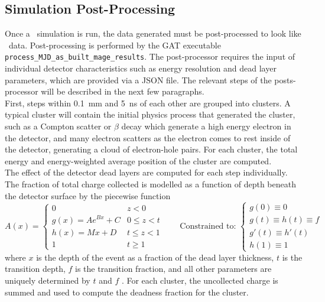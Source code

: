 \documentclass[/main.tex]{subfiles}
\begin{document}
\subsection{Simulation Post-Processing} \label{sec:simpostproc}
Once a \Mage\ simulation is run, the data generated must be post-processed to look like \MJD\ data.
Post-processing is performed by the GAT executable \texttt{process\_MJD\_as\_built\_mage\_results}.
The post-processor requires the input of individual detector characteristics such as energy resolution and dead layer parameters, which are provided via a JSON file.
The relevant steps of the posts-processor will be described in the next few paragraphs.
\\
First, steps within 0.1~mm and 5~ns of each other are grouped into clusters.
A typical cluster will contain the initial physics process that generated the cluster, such as a Compton scatter or $\beta$ decay which generate a high energy electron in the detector, and many electron scatters as the electron comes to rest inside of the detector, generating a cloud of electron-hole pairs.
For each cluster, the total energy and energy-weighted average position of the cluster are computed.
\\
The effect of the detector dead layers are computed for each step individually.
The fraction of total charge collected is modelled as a function of depth beneath the detector surface by the piecewise function
\begin{equation}
  A(x) = \begin{cases}
    0 & z < 0 \\
    g(x)=Ae^{Bx} + C & 0 \leq z < t \\
    h(x)=Mx + D & t \leq z < 1 \\
    1 & t \geq 1
  \end{cases}  \qquad
  \text{Constrained to: } \begin{cases}
    g(0)\equiv 0 \\ g(t)\equiv h(t)\equiv f \\ g'(t)\equiv h'(t) \\ h(1)\equiv 1
  \end{cases}
\end{equation}
where $x$ is the depth of the event as a fraction of the dead layer thickness, $t$ is the transition depth, $f$ is the transition fraction, and all other parameters are uniquely determined by $t$ and $f$ \cite{giovenetti2015phd}\cite{buuck2018}.
For each cluster, the uncollected charge is summed and used to compute the deadness fraction for the cluster.
\end{document}
